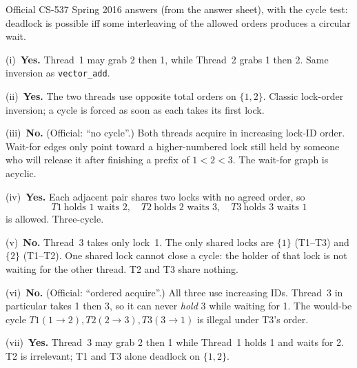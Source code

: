 \documentclass[11pt,a4paper]{article}
\newenvironment{Sol}{%
  \begin{tcolorbox}[sboxstyle, title={Solution}]%
}{%
  \end{tcolorbox}\vspace{0.35em}%
}
\begin{document}
\begin{Sol}
Official CS-537 Spring 2016 answers (from the answer sheet), with the
cycle test: deadlock is possible iff some interleaving of the allowed
orders produces a circular wait.

(i)~\textbf{Yes.} Thread~1 may grab 2 then 1, while Thread~2 grabs 1 then
2. Same inversion as \texttt{vector\_add}.

(ii)~\textbf{Yes.} The two threads use opposite total orders on $\{1,2\}$.
Classic lock-order inversion; a cycle is forced as soon as each takes its
first lock.

(iii)~\textbf{No.} (Official: ``no cycle''.) Both threads acquire in
increasing lock-ID order. Wait-for edges only point toward a
higher-numbered lock still held by someone who will release it after
finishing a prefix of $1 < 2 < 3$. The wait-for graph is acyclic.

(iv)~\textbf{Yes.} Each adjacent pair shares two locks with no agreed
order, so
\[
T1\ \text{holds 1 waits 2},\quad
T2\ \text{holds 2 waits 3},\quad
T3\ \text{holds 3 waits 1}
\]
is allowed. Three-cycle.

(v)~\textbf{No.} Thread~3 takes only lock~1. The only shared locks are
$\{1\}$ (T1--T3) and $\{2\}$ (T1--T2). One shared lock cannot close a
cycle: the holder of that lock is not waiting for the other thread. T2
and T3 share nothing.

(vi)~\textbf{No.} (Official: ``ordered acquire''.) All three use
increasing IDs. Thread~3 in particular takes 1 then 3, so it can never
\emph{hold} 3 while waiting for 1. The would-be cycle
$T1(1{\to}2), T2(2{\to}3), T3(3{\to}1)$ is illegal under T3's order.

(vii)~\textbf{Yes.} Thread~3 may grab 2 then 1 while Thread~1 holds 1 and
waits for 2. T2 is irrelevant; T1 and T3 alone deadlock on $\{1,2\}$.
\end{Sol}
\end{document}
